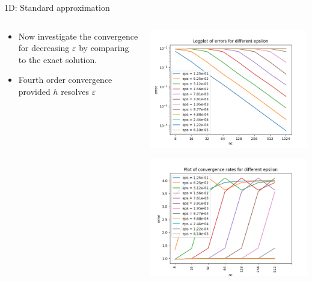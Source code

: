 \documentclass{beamer}
\renewcommand{\epsilon}{\varepsilon}
\begin{document}
\begin{frame}[t]{1D: Standard approximation}
\begin{columns}
    \begin{column}[c]{.5\textwidth}
      \begin{itemize}
      \item Now investigate the convergence for decreasing $\epsilon$ by comparing to the exact solution.
      \item Fourth order convergence provided $h$ resolves $\epsilon$
    \end{itemize}
  \end{column}
  \begin{column}[c]{.5\textwidth}

    \includegraphics[width=0.85\linewidth]{one_dim_h_eps1.png}

    \includegraphics[width=0.85\linewidth]{one_dim_h_eps2.png}
 \end{column}
\end{columns}
\end{frame}
\end{document}
